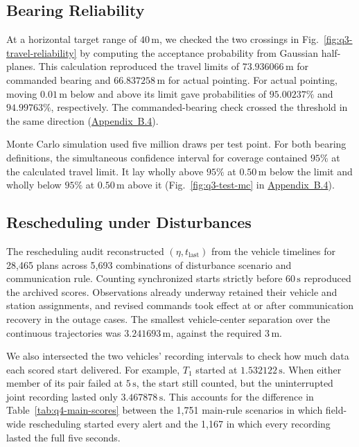 \documentclass{swmcmthesis}
\begin{document}
\subsection{Bearing Reliability}

At a horizontal target range of \(40\,\mathrm m\), we checked the two crossings in Fig.~\ref{fig:q3-travel-reliability} by computing the acceptance probability from Gaussian half-planes. This calculation reproduced the travel limits of \(73.936066\,\mathrm m\) for commanded bearing and \(66.837258\,\mathrm m\) for actual pointing. For actual pointing, moving \(0.01\,\mathrm m\) below and above its limit gave probabilities of \(95.00237\%\) and \(94.99763\%\), respectively. The commanded-bearing check crossed the threshold in the same direction (\hyperref[app:q3-alternatives]{Appendix~B.4}).

Monte Carlo simulation used five million draws per test point. For both bearing definitions, the simultaneous confidence interval for coverage contained \(95\%\) at the calculated travel limit. It lay wholly above \(95\%\) at \(0.50\,\mathrm m\) below the limit and wholly below \(95\%\) at \(0.50\,\mathrm m\) above it (Fig.~\ref{fig:q3-test-mc} in \hyperref[app:q3-alternatives]{Appendix~B.4}).

\subsection{Rescheduling under Disturbances}

The rescheduling audit reconstructed \((\eta,t_{\mathrm{last}})\) from the vehicle timelines for 28,465 plans across 5,693 combinations of disturbance scenario and communication rule. Counting synchronized starts strictly before \(60\,\mathrm s\) reproduced the archived scores. Observations already underway retained their vehicle and station assignments, and revised commands took effect at or after communication recovery in the outage cases. The smallest vehicle-center separation over the continuous trajectories was \(3.241693\,\mathrm m\), against the required \(3\,\mathrm m\).

We also intersected the two vehicles' recording intervals to check how much data each scored start delivered. For example, \(T_1\) started at \(1.532122\,\mathrm s\). When either member of its pair failed at \(5\,\mathrm s\), the start still counted, but the uninterrupted joint recording lasted only \(3.467878\,\mathrm s\). This accounts for the difference in Table~\ref{tab:q4-main-scores} between the 1,751 main-rule scenarios in which field-wide rescheduling started every alert and the 1,167 in which every recording lasted the full five seconds.
\end{document}
